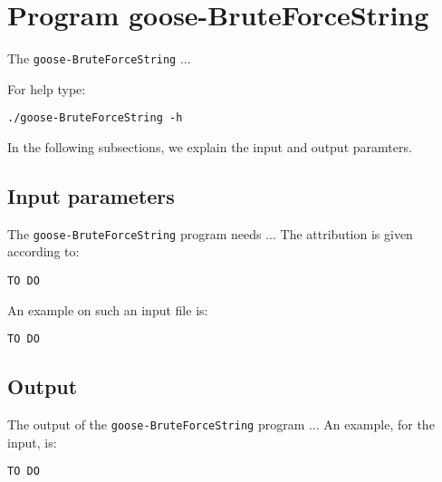 \section{Program goose-BruteForceString}
The \texttt{goose-BruteForceString} ...

For help type:
\begin{lstlisting}
./goose-BruteForceString -h
\end{lstlisting}
In the following subsections, we explain the input and output paramters.

\subsection*{Input parameters}

The \texttt{goose-BruteForceString} program needs ...
The attribution is given according to:
\begin{lstlisting}
TO DO
\end{lstlisting}

An example on such an input file is:
\begin{lstlisting}
TO DO
\end{lstlisting}

\subsection*{Output}
The output of the \texttt{goose-BruteForceString} program ...
An example, for the input, is:
\begin{lstlisting}
TO DO
\end{lstlisting}
